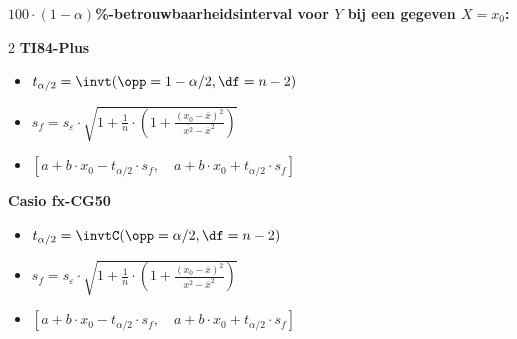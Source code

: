 \textbf{\boldmath$100\cdot(1-\alpha)$\si{\percent}-betrouwbaarheidsinterval voor $Y$ bij een gegeven $X = x_0$:}
    \begin{multicols}{2}
        \centering\textbf{TI84-Plus}
            \begin{itemize}
                \item $t_{\alpha/2} = \invt(\opp=1-\alpha/2, \df = n - 2)$
                \item $s_f = s_{\varepsilon} \cdot \sqrt{ 1 + \frac{1}{n} \cdot \left( 1 + \frac{(x_0 - \overline{x})^2}{\overline{x^2} - \overline{x}^2} \right) }$
                \item $[a+b\cdot x_0 - t_{\alpha/2} \cdot s_f, \quad a+b\cdot x_0 + t_{\alpha/2} \cdot s_f]$
            \end{itemize}

            \columnbreak

            \centering\textbf{Casio fx-CG50}
            \begin{itemize}
                \item $t_{\alpha/2} = \invtC(\opp=\alpha/2, \df = n - 2)$
                \item $s_f = s_{\varepsilon} \cdot \sqrt{ 1 + \frac{1}{n} \cdot \left( 1 + \frac{(x_0 - \overline{x})^2}{\overline{x^2} - \overline{x}^2} \right) }$
                \item $[a+b\cdot x_0 - t_{\alpha/2} \cdot s_f, \quad a+b\cdot x_0 + t_{\alpha/2} \cdot s_f]$
            \end{itemize}
    \end{multicols}







